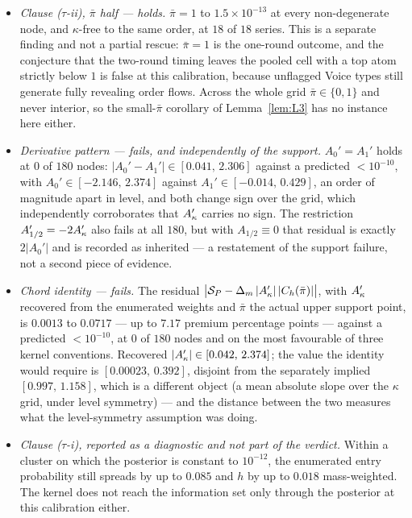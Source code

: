\begin{remark}
\begin{itemize}[leftmargin=1.6em,itemsep=3pt]
  $10^{-6}$, against a predicted $<10^{-12}$, at $0$ of $18$ series.
\item \emph{Clause ($\tau$-ii), $\bar\pi$ half --- holds.} $\bar\pi = 1$ to $1.5\times10^{-13}$ at
  every non-degenerate node, and $\kappa$-free to the same order, at $18$ of $18$ series. This is a
  separate finding and not a partial rescue: $\bar\pi = 1$ is the one-round outcome, and the
  conjecture that the two-round timing leaves the pooled cell with a top atom strictly below $1$ is
  false at this calibration, because unflagged Voice types still generate fully revealing order
  flows. Across the whole grid $\bar\pi \in \{0,1\}$ and never interior, so the small-$\bar\pi$
  corollary of Lemma~\ref{lem:L3} has no instance here either.
\item \emph{Derivative pattern --- fails, and independently of the support.} $A_0' = A_1'$ holds at
  $0$ of $180$ nodes: $|A_0' - A_1'| \in [0.041,\,2.306]$ against a predicted $<10^{-10}$, with
  $A_0' \in [-2.146,\,2.374]$ against $A_1' \in [-0.014,\,0.429]$, an order of magnitude apart in
  level, and both change sign over the grid, which independently corroborates that $A'_{\kappa}$ carries
  no sign. The restriction $A_{1/2}' = -2A'_{\kappa}$ also fails at all $180$, but with
  $A_{1/2} \equiv 0$ that residual is exactly $2|A_0'|$ and is recorded as inherited --- a
  restatement of the support failure, not a second piece of evidence.
\item \emph{Chord identity --- fails.} The residual
  $\bigl|\mathcal S_P - \Delta_m\,|A'_{\kappa}|\,|C_h(\bar\pi)|\bigr|$, with $A'_{\kappa}$ recovered from the
  enumerated weights and $\bar\pi$ the actual upper support point, is $0.0013$ to $0.0717$ --- up to
  $7.17$ premium percentage points --- against a predicted $<10^{-10}$, at $0$ of $180$ nodes and on
  the most favourable of three kernel conventions. Recovered $|A'_{\kappa}| \in [0.042,\,2.374]$; the value
  the identity would require is $[0.00023,\,0.392]$, disjoint from the separately implied
  $[0.997,\,1.158]$, which is a different object (a mean absolute slope over the $\kappa$ grid, under
  level symmetry) --- and the distance between the two measures what the level-symmetry assumption
  was doing.
\item \emph{Clause ($\tau$-i), reported as a diagnostic and not part of the verdict.} Within a
  cluster on which the posterior is constant to $10^{-12}$, the enumerated entry probability still
  spreads by up to $0.085$ and $h$ by up to $0.018$ mass-weighted. The kernel does not reach the
  information set only through the posterior at this calibration either.

\end{itemize}
\end{remark}
